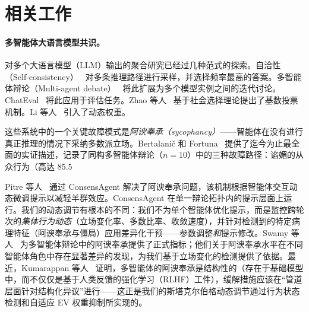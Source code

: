 \section{相关工作}
\label{sec:related}

\paragraph{多智能体大语言模型共识。}
对多个大语言模型（LLM）输出的聚合研究已经过几种范式的探索。自洽性（Self-consistency）~\cite{wang2023selfconsistency} 对多条推理路径进行采样，并选择频率最高的答案。多智能体辩论（Multi-agent debate）~\cite{du2024improving,choi2025debate} 将此扩展为多个模型实例之间的迭代讨论。ChatEval~\cite{chan2023chateval} 将此应用于评估任务。Zhao 等人~\cite{zhao2024electoral} 基于社会选择理论提出了基数投票机制。Li 等人~\cite{li2025dynamic} 引入了动态权重。

这些系统中的一个关键故障模式是\emph{阿谀奉承（sycophancy）}——智能体在没有进行真正推理的情况下采纳多数派立场。Bertalani\v{c} 和 Fortuna~\cite{bertalanic2026cost} 提供了迄今为止最全面的实证描述，记录了同构多智能体辩论（$n{=}10$）中的三种故障路径：谄媚的从众行为（高达 85.5%

Pitre 等人~\cite{pitre2025consensagent} 通过 ConsensAgent 解决了阿谀奉承问题，该机制根据智能体交互动态微调提示以减轻羊群效应。ConsensAgent 在单一辩论拓扑内的提示层面上运行。我们的动态调节有根本的不同：我们不为单个智能体优化提示，而是监控跨轮次的\emph{集体行为动态}（立场变化率、多数比率、收敛速度），并针对检测到的特定病理特征（阿谀奉承与僵局）应用差异化干预——参数调整\emph{和}提示修改。Swamy 等人~\cite{swamy2025peacemaker} 为多智能体辩论中的阿谀奉承提供了正式指标；他们关于阿谀奉承水平在不同智能体角色中存在显著差异的发现，为我们基于立场变化的检测提供了依据。最近，Kumarappan 等人~\cite{kumarappan2026alignment} 证明，多智能体的阿谀奉承是结构性的（存在于基础模型中，而不仅仅是基于人类反馈的强化学习（RLHF）工件），缓解措施应该在“管道层面针对结构化异议”进行——这正是我们的斯塔克尔伯格动态调节通过行为状态检测和自适应 EV 权重抑制所实现的。

